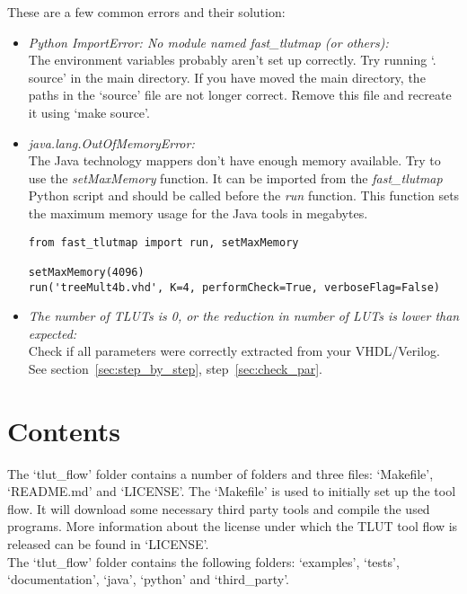 \documentclass[a4paper,oneside]{memoir}
\begin{document}
These are a few common errors and their solution:
\begin{itemize}
\item \emph{Python ImportError: No module named fast\_tlutmap (or others):}\\
The environment variables probably aren't set up correctly. Try running `. source' in the main directory. 
If you have moved the main directory, the paths in the `source' file are not longer correct. Remove this file and recreate it using `make source'.

\item \emph{java.lang.OutOfMemoryError:}\\
The Java technology mappers don't have enough memory available. Try to use the \emph{setMaxMemory} function. It can be imported from the \emph{fast\_tlutmap} Python script and should be called before the \emph{run} function. This function sets the maximum memory usage for the Java tools in megabytes.
\lstset{language=python}
\begin{lstlisting}
from fast_tlutmap import run, setMaxMemory

setMaxMemory(4096)
run('treeMult4b.vhd', K=4, performCheck=True, verboseFlag=False)
\end{lstlisting}

\item \emph{The number of TLUTs is 0, or the reduction in number of LUTs is lower than expected:}\\
Check if all parameters were correctly extracted from your VHDL/Verilog. See section~\ref{sec:step_by_step}, step~\ref{sec:check_par}.
\end{itemize}

\clearpage
\chapter{Contents}\label{sec:contents}
The `tlut\_flow' folder contains a number of folders and three files: `Makefile', `README.md' and `LICENSE'. 
The `Makefile' is used to initially set up the tool flow. It will download  some necessary third party tools and compile the used programs.
More information about the license under which the TLUT tool flow is released can be found in `LICENSE'.\\

The `tlut\_flow' folder contains the following folders:  `examples', `tests', `documentation',  `java', `python' and `third\_party'.
\end{document}
